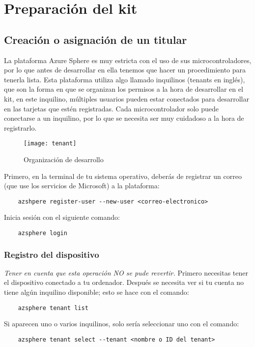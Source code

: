 \section{Preparación del kit}
\subsection{Creación o asignación de un titular}
La plataforma Azure Sphere es muy estricta con el uso de sus microcontroladores, por lo que antes de desarrollar en ella tenemos que hacer un procedimiento para tenerla lista. Esta plataforma utiliza algo llamado inquilinos (tenants en inglés), que son la forma en que se organizan los permisos a la hora de desarrollar en el kit, en este inquilino, múltiples usuarios pueden estar conectados para desarrollar en las tarjetas que estén registradas. Cada microcontrolador solo puede conectarse a un inquilino, por lo que se necesita ser muy cuidadoso a la hora de registrarlo.

\begin{figure}[h]
	\centering
	\texttt{[image: tenant]}
	\caption{Organización de desarrollo}
\end{figure}

Primero, en la terminal de tu sistema operativo, deberás de registrar un correo (que use los servicios de Microsoft) a la plataforma: 
\begin{verbatim}
	azshpere register-user --new-user <correo-electronico>
\end{verbatim}

Inicia sesión con el siguiente comando:
\begin{verbatim}
	azsphere login
\end{verbatim}

\subsubsection{Registro del dispositivo}
\textit{Tener en cuenta que esta operación NO se pude revertir.}
\linebreak
\linebreak
Primero necesitas tener el dispositivo conectado a tu ordenador. Después se necesita ver si tu cuenta no tiene algún inquilino disponible; esto se hace con el comando:
\begin{verbatim}
	azsphere tenant list
\end{verbatim}
Si aparecen uno o varios inquilinos, solo sería seleccionar uno con el comando:
\begin{verbatim}
	azsphere tenant select --tenant <nombre o ID del tenant>
\end{verbatim}

